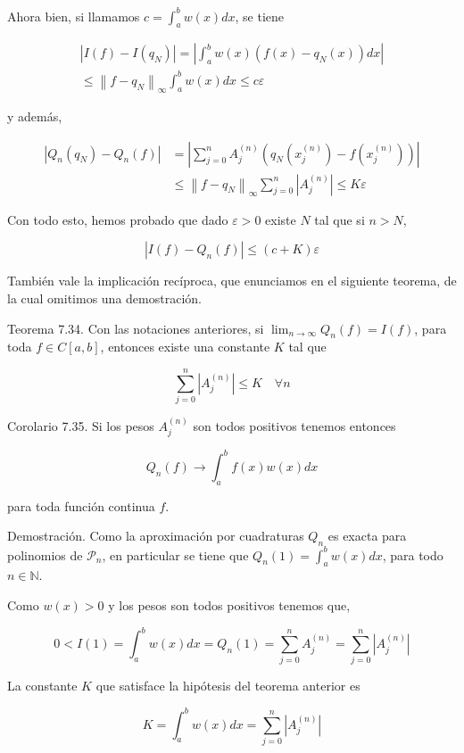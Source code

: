\documentclass[10pt]{book}
\begin{document}
Ahora bien, si llamamos $c=\int_{a}^{b} w(x) d x$, se tiene

$$
\begin{gathered}
\left|I(f)-I\left(q_{N}\right)\right|=\left|\int_{a}^{b} w(x)\left(f(x)-q_{N}(x)\right) d x\right| \\
\leq\left\|f-q_{N}\right\|_{\infty} \int_{a}^{b} w(x) d x \leq c \varepsilon
\end{gathered}
$$

y además,

$$
\begin{aligned}
\left|Q_{n}\left(q_{N}\right)-Q_{n}(f)\right| & =\left|\sum_{j=0}^{n} A_{j}^{(n)}\left(q_{N}\left(x_{j}^{(n)}\right)-f\left(x_{j}^{(n)}\right)\right)\right| \\
& \leq\left\|f-q_{N}\right\|_{\infty} \sum_{j=0}^{n}\left|A_{j}^{(n)}\right| \leq K \varepsilon
\end{aligned}
$$

Con todo esto, hemos probado que dado $\varepsilon>0$ existe $N$ tal que si $n>N$,

$$
\left|I(f)-Q_{n}(f)\right| \leq(c+K) \varepsilon
$$

También vale la implicación recíproca, que enunciamos en el siguiente teorema, de la cual omitimos una demostración.

Teorema 7.34. Con las notaciones anteriores, si $\lim _{n \rightarrow \infty} Q_{n}(f)=I(f)$, para toda $f \in C[a, b]$, entonces existe una constante $K$ tal que

$$
\sum_{j=0}^{n}\left|A_{j}^{(n)}\right| \leq K \quad \forall n
$$

Corolario 7.35. Si los pesos $A_{j}^{(n)}$ son todos positivos tenemos entonces

$$
Q_{n}(f) \rightarrow \int_{a}^{b} f(x) w(x) d x
$$

para toda función continua $f$.

Demostración. Como la aproximación por cuadraturas $Q_{n}$ es exacta para polinomios de $\mathcal{P}_{n}$, en particular se tiene que $Q_{n}(1)=\int_{a}^{b} w(x) d x$, para todo $n \in \mathbb{N}$.

Como $w(x)>0$ y los pesos son todos positivos tenemos que,

$$
0<I(1)=\int_{a}^{b} w(x) d x=Q_{n}(1)=\sum_{j=0}^{n} A_{j}^{(n)}=\sum_{j=0}^{n}\left|A_{j}^{(n)}\right|
$$

La constante $K$ que satisface la hipótesis del teorema anterior es

$$
K=\int_{a}^{b} w(x) d x=\sum_{j=0}^{n}\left|A_{j}^{(n)}\right|
$$
\end{document}
